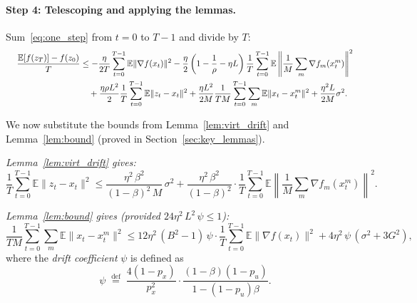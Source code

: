 \documentclass{article}
\begin{document}
\paragraph{Step 4: Telescoping and applying the lemmas.}

Sum~\eqref{eq:one_step} from $t = 0$ to $T-1$ and divide by $T$:
\begin{equation}
\resizebox{0.98\linewidth}{!}{$
\begin{aligned}
\frac{\mathbb{E}[f(z_T)] - f(z_0)}{T}
&\leq
-\frac{\eta}{2T}\sum_{t=0}^{T-1}\mathbb{E}\|\nabla f(x_t)\|^2
-\frac{\eta}{2}\left(1-\frac{1}{\rho}-\eta L\right)
\frac{1}{T}\sum_{t=0}^{T-1}
\mathbb{E}\left\|\frac{1}{M}\sum_m \nabla f_m(x_t^m)\right\|^2  \\
&\quad
+\frac{\eta\rho L^2}{2}
\frac{1}{T}\sum_{t=0}^{T-1}\mathbb{E}\|z_t-x_t\|^2
+\frac{\eta L^2}{2M}
\frac{1}{TM}\sum_{t=0}^{T-1}\sum_m
\mathbb{E}\|x_t-x_t^m\|^2
+\frac{\eta^2L}{2M}\sigma^2 .
\end{aligned}
$}
\label{eq:telescoped}
\end{equation}

We now substitute the bounds from Lemma~\ref{lem:virt_drift} and
Lemma~\ref{lem:bound} (proved in Section~\ref{sec:key_lemmas}).

\medskip
\noindent\emph{Lemma~\ref{lem:virt_drift} gives:}
\begin{equation}
\frac{1}{T}\sum_{t=0}^{T-1}\mathbb{E}\|z_t - x_t\|^2
\leq \frac{\eta^2\,\beta^2}{(1-\beta)^2\,M}\,\sigma^2
  + \frac{\eta^2\,\beta^2}{(1-\beta)^2}\cdot
    \frac{1}{T}\sum_{t=0}^{T-1}\mathbb{E}\left\|\frac{1}{M}\sum_m
    \nabla f_m(x_t^m)\right\|^2.
\label{eq:lem2_applied}
\end{equation}

\noindent\emph{Lemma~\ref{lem:bound} gives (provided $24\eta^2\,L^2\,\psi \leq 1$):}
\begin{equation}
\frac{1}{TM}\sum_{t=0}^{T-1}\sum_m\mathbb{E}\|x_t - x_t^m\|^2
\leq 12\eta^2\,(B^2-1)\,\psi\cdot
  \frac{1}{T}\sum_{t=0}^{T-1}\mathbb{E}\|\nabla f(x_t)\|^2
  + 4\eta^2\,\psi\,(\sigma^2 + 3G^2),
\label{eq:lem3_applied}
\end{equation}
where the \emph{drift coefficient} $\psi$ is defined as
\begin{equation}
\psi \;\stackrel{\text{def}}{=}\;
\frac{4(1-p_x)}{p_x^2}\cdot
\frac{(1-\beta)(1-p_u)}{1-(1-p_u)\beta}.
\label{eq:psi_def}
\end{equation}
\end{document}
